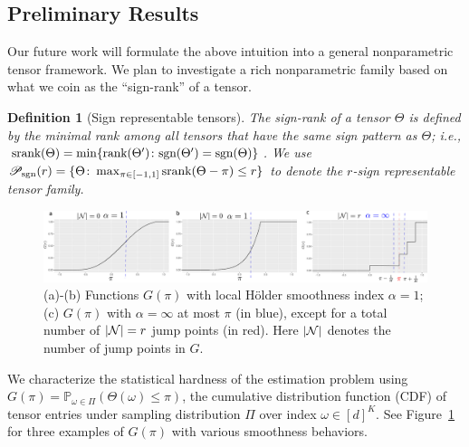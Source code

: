 \documentclass[11pt]{article}
\def\sign{\textup{sgn}}
\theoremstyle{exampstyle}
\newtheorem{defn}{Definition}[section]
\theoremstyle{definition}
\def\sign{\textup{sgn}}
\def\srank{\textup{srank}}
\def\rank{\textup{rank}}
\def\caliP{\mathscr{P}_{\textup{sgn}}}
\begin{document}
  \vspace{-.3cm}
\subsection{Preliminary Results}\label{sec:model}
  \vspace{-.3cm}
Our future work will formulate the above intuition into a general nonparametric tensor framework. We plan to investigate a rich nonparametric family based on what we coin as the ``sign-rank'' of a tensor. 
\begin{defn}[Sign representable tensors] 
The sign-rank of a tensor $\Theta$ is defined by the minimal rank among all tensors that have the same sign pattern as $\Theta$; i.e., $\text{srank}(\Theta)= \min \{\rank(\Theta')\colon  \sign(\Theta')=\sign(\Theta)\}$. We use $\caliP(r)=\{\Theta\colon \max_{\pi\in[-1,1]}\srank(\Theta-\pi)\leq r\}$ to denote the $r$-sign representable tensor family.
\end{defn}

 \begin{figure}[http]
 \centering
 \includegraphics[width = .8\textwidth]{cdf_new.pdf}
 \vspace{-.2cm}
 \caption{(a)-(b) Functions $G(\pi)$ with local H\"older smoothness index $\alpha = 1$; (c) $G(\pi)$ with $\alpha =\infty$ at most $\pi$ (in blue), except for a total number of $|\mathcal{N}| = r$ jump points (in red). Here $|\mathcal{N}|$ denotes the number of jump points in $G$.}\label{fig:cdf}
\vspace{-.2cm}
 \end{figure}
 
We characterize the statistical hardness of the estimation problem using $G(\pi)=\mathbb{P}_{\omega\in\Pi}(\Theta(\omega)\leq \pi)$, the cumulative distribution function (CDF) of tensor entries under sampling distribution $\Pi$ over index $\omega\in [d]^K$. See Figure~\ref{fig:cdf} for three examples of $G(\pi)$ with various smoothness behaviors. 
  
\end{document}
